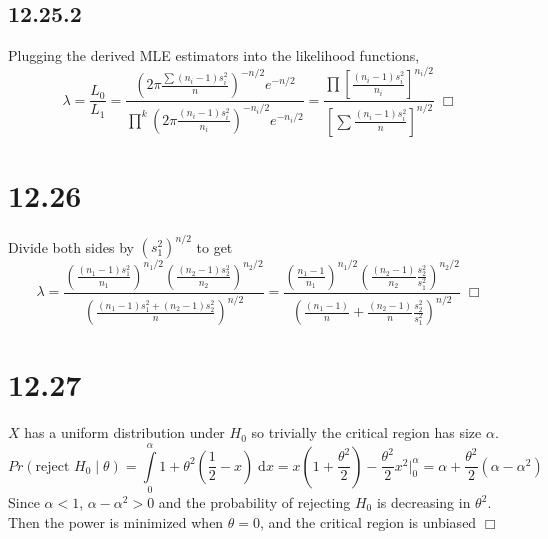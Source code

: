 \documentclass{article}
\begin{document}
\subsection*{12.25.2}
Plugging the derived MLE estimators into the likelihood functions,
$$\lambda = \frac{L_0}{L_1} = \frac{(2\pi\frac{\sum(n_i-1)s_i^2}{n})^{-n/2} e^{-n/2}}{\prod\limits^k (2\pi\frac{(n_i-1)s_i^2}{n_i})^{-n_i/2} e^{-n_i/2}} = \frac{\prod \left[\frac{(n_i-1)s_i^2}{n_i}\right]^{n_i/2}}{\left[\sum \frac{(n_i-1)s_i^2}{n}\right]^{n/2}} \; \Box$$

\section*{12.26}
Divide both sides by $(s_1^2)^{n/2}$ to get
$$\lambda = \frac{\left(\frac{(n_1-1)s_1^2}{n_1}\right)^{n_1/2} \left(\frac{(n_2-1)s_2^2}{n_2}\right)^{n_2/2}}{\left(\frac{(n_1-1)s_1^2 + (n_2-1)s_2^2}{n}\right)^{n/2}} = \frac{\left(\frac{n_1-1}{n_1}\right)^{n_1/2}\left(\frac{(n_2-1)}{n_2}\frac{s_2^2}{s_1^2}\right)^{n_2/2}}{\left(\frac{(n_1-1)}{n}+\frac{(n_2-1)}{n}\frac{s_2^2}{s_1^2}\right)^{n/2}} \; \Box$$

\section*{12.27}
$X$ has a uniform distribution under $H_0$ so trivially the critical region has size $\alpha$.
$$Pr(\textrm{reject } H_0 \;|\; \theta) = \int\limits_0^\alpha 1 + \theta^2(\frac{1}{2}-x)\;\mathrm{d}x = x\left(1+\frac{\theta^2}{2}\right)-\frac{\theta^2}{2}x^2 \Big\vert_0^\alpha = \alpha + \frac{\theta^2}{2}(\alpha-\alpha^2)$$
Since $\alpha < 1$, $\alpha - \alpha^2 > 0$ and the probability of rejecting $H_0$ is decreasing in $\theta^2$. Then the power is minimized when $\theta = 0$, and the critical region is unbiased $\Box$
\end{document}
